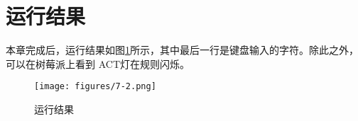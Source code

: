 \documentclass[main.tex]{subfiles}
\begin{document}
\begin{CJK*}{UTF8}{song}
\begin{code}
\label{code:7-12}
\inputminted[firstline=20,lastline=80,linenos,numbersep=5pt,frame=lines,framesep=2mm]{c}{src/chapter07/kernel/led.c}
\end{code}

\section{运行结果}
本章完成后，运行结果如图\ref{figure:7-2}所示，其中最后一行是键盘输入的字符。除此之外，可以在树莓派上看到 ACT灯在规则闪烁。

\begin{figure}[htp]
\centering
\texttt{[image: figures/7-2.png]}
\caption{运行结果}
\label{figure:7-2}
\end{figure}

\clearpage
\ifxetex\else\end{CJK*}\fi
\end{document}
